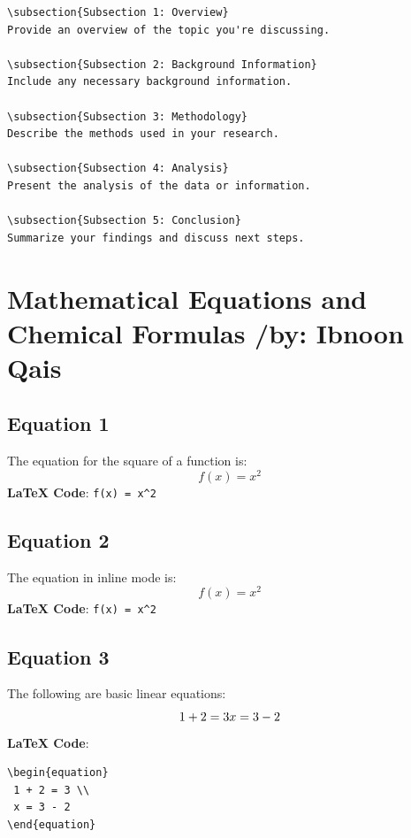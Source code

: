 \documentclass[12pt,a4paper]{article}
\begin{document}
\begin{verbatim}
\subsection{Subsection 1: Overview}
Provide an overview of the topic you're discussing.

\subsection{Subsection 2: Background Information}
Include any necessary background information.

\subsection{Subsection 3: Methodology}
Describe the methods used in your research.

\subsection{Subsection 4: Analysis}
Present the analysis of the data or information.

\subsection{Subsection 5: Conclusion}
Summarize your findings and discuss next steps.
\end{verbatim}
	\newpage
 \section{Mathematical Equations and Chemical Formulas /by: Ibnoon Qais}
 \subsection{Equation 1}
The equation for the square of a function is:
\begin{equation}
 f(x) = x^2  
\end{equation}
\textbf{LaTeX Code}: \texttt{f(x) = x\textasciicircum 2}

\subsection{Equation 2}
The equation in inline mode is:
\[
 f(x) = x^2
\]
\textbf{LaTeX Code}: \texttt{f(x) = x\textasciicircum 2}

\subsection{Equation 3}
The following are basic linear equations:
\begin{equation}
 1 + 2 = 3 \\
 x = 3 - 2
\end{equation}
\textbf{LaTeX Code}: 
\begin{verbatim}
\begin{equation}
 1 + 2 = 3 \\
 x = 3 - 2
\end{equation}
\end{verbatim}
\end{document}
